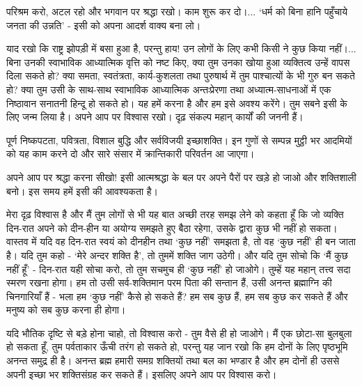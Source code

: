 परिश्रम करो, अटल रहो और भगवान पर श्रद्धा रखो। काम शुरू कर दो।... ‘धर्म को बिना हानि पहुँचाये जनता की उन्नति’ - इसी को अपना आदर्श वाक्य बना लो। 

याद रखो कि राष्ट्र झोपड़ी में बसा हुआ है, परन्तु हाय! उन लोगों के लिए कभी किसी ने कुछ किया नहीं।... बिना उनकी स्वाभाविक आध्यात्मिक वृत्ति को नष्ट किए, क्या तुम उनका खोया हुआ व्यक्तित्व उन्हें वापस दिला सकते हो? क्या समता, स्वतंत्रता, कार्य-कुशलता तथा पुरुषार्थ में तुम पाश्चात्यों के भी गुरु बन सकते हो? क्या तुम उसी के साथ-साथ स्वाभाविक आध्यात्मिक अन्तःप्रेरणा तथा अध्यात्म-साधनाओं में एक निष्ठावान सनातनी हिन्दू हो सकते हो। यह हमें करना है और हम इसे अवश्य करेंगे। तुम सबने इसी के लिए जन्म लिया है। अपने आप पर विश्वास रखो। दृढ़ संकल्प महान् कार्यों की जननी हैं। 

पूर्ण निष्कपटता, पवित्रता, विशाल बुद्धि और सर्वविजयी इच्छाशक्ति। इन गुणों से सम्पन्न मुट्ठी भर आदमियों को यह काम करने दो और सारे संसार में क्रान्तिकारी परिवर्तन आ जाएगा। 

अपने आप पर श्रद्धा करना सीखो! इसी आत्मश्रद्धा के बल पर अपने पैरों पर खड़े हो जाओ और शक्तिशाली बनो। इस समय हमें इसी की आवश्यकता है। 

मेरा दृढ़ विश्वास है और मैं तुम लोगों से भी यह बात अच्छी तरह समझ लेने को कहता हूँ कि जो व्यक्ति दिन-रात अपने को दीन-हीन या अयोग्य समझते हुए बैठा रहेगा, उसके द्वारा कुछ भी नहीं हो सकता। वास्तव में यदि वह दिन-रात स्वयं को दीनहीन तथा ‘कुछ नहीं’ समझता है, तो वह ‘कुछ नहीं’ ही बन जाता है। यदि तुम कहो - ‘मेरे अन्दर शक्ति है’, तो तुममें शक्ति जाग उठेगी। और यदि तुम सोचो कि ‘मैं कुछ नहीं हूँ’ - दिन-रात यही सोचा करो, तो तुम सचमुच ही ‘कुछ नहीं’ हो जाओगे। तुम्हें यह महान् तत्त्व सदा स्मरण रखना होगा। हम तो उसी सर्व-शक्तिमान परम पिता की सन्तान हैं, उसी अनन्त ब्रह्माग्नि की चिनगारियाँ हैं - भला हम ‘कुछ नहीं’ कैसे हो सकते हैं? हम सब कुछ हैं, हम सब कुछ कर सकते हैं और मनुष्य को सब कुछ करना ही होगा। 

यदि भौतिक दृष्टि से बड़े होना चाहो, तो विश्वास करो - तुम वैसे ही हो जाओगे। मैं एक छोटा-सा बुलबुला हो सकता हूँ, तुम पर्वताकार ऊँची तरंग हो सकते हो, परन्तु यह जान रखो कि हम दोनों के लिए पृष्ठभूमि अनन्त समुद्र ही है। अनन्त ब्रह्म हमारी समग्र शक्तियों तथा बल का भण्डार है और हम दोनों ही उससे अपनी इच्छा भर शक्तिसंग्रह कर सकते हैं। इसलिए अपने आप पर विश्वास करो। 

\delimiter

\addtoendnotes{\protect\end{multicols}}

